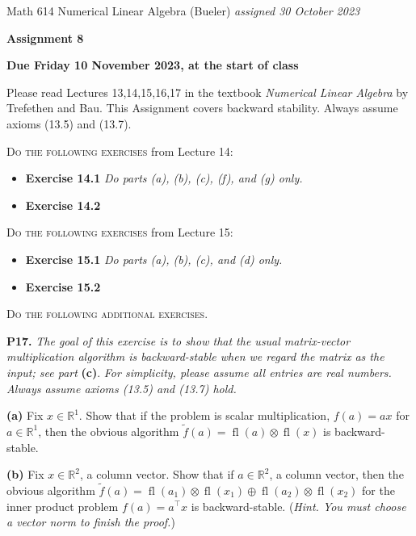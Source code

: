 \documentclass[12pt]{amsart}
\newcommand{\RR}{\mathbb{R}}
\newcommand{\prob}[1]{\bigskip\noindent\textbf{#1.}\quad }
\newcommand{\epart}[1]{\medskip\noindent\textbf{(#1)}\quad }
\newcommand{\fl}{\operatorname{fl}}
\begin{document}
\scriptsize \noindent Math 614 Numerical Linear Algebra (Bueler) \hfill \emph{assigned 30 October 2023}
\normalsize\medskip

\Large\centerline{\textbf{Assignment 8}}
\large
\medskip

\centerline{\textbf{Due Friday 10 November 2023, at the start of class}}
\medskip
\normalsize

\thispagestyle{empty}

\bigskip
\noindent Please read Lectures 13,14,15,16,17 in the textbook \emph{Numerical Linear Algebra} by Trefethen and Bau.  This Assignment covers backward stability.  Always assume axioms (13.5) and (13.7).

\bigskip
\noindent \textsc{Do the following exercises} from Lecture 14:

\begin{itemize}
\item \textbf{Exercise 14.1} \quad \emph{Do parts \emph{(a)}, \emph{(b)}, \emph{(c)}, \emph{(f)}, and \emph{(g)} only.}
\item \textbf{Exercise 14.2}
\end{itemize}

\bigskip
\noindent \textsc{Do the following exercises} from Lecture 15:

\begin{itemize}
\item \textbf{Exercise 15.1} \quad \emph{Do parts \emph{(a)}, \emph{(b)}, \emph{(c)}, and \emph{(d)} only.}
\item \textbf{Exercise 15.2}
\end{itemize}


\bigskip
\noindent \textsc{Do the following additional exercises.}

\medskip

\prob{P17}  \emph{The goal of this exercise is to show that the usual matrix-vector multiplication algorithm is backward-stable when we regard the \emph{matrix} as the input; see part} \textbf{(c)}.  \emph{For simplicity, please assume all entries are real numbers.  Always assume axioms (13.5) and (13.7) hold.}

\epart{a}  Fix $x\in \RR^1$.  Show that if the problem is scalar multiplication, $f(a) = ax$ for $a \in \RR^1$, then the obvious algorithm $\tilde f(a) = \fl(a)\otimes \fl(x)$ is backward-stable.

\epart{b}  Fix $x\in \RR^2$, a column vector.   Show that if $a \in \RR^2$, a column vector, then the obvious algorithm $\tilde f(a) = \fl(a_1)\otimes \fl(x_1) \oplus \fl(a_2)\otimes \fl(x_2)$ for the inner product problem $f(a) = a^\top x$ is backward-stable.  (\emph{Hint.  You must choose a vector norm to finish the proof.})
\end{document}
